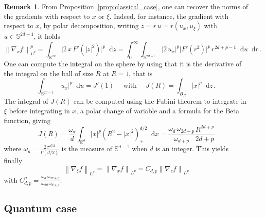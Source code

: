 \documentclass[11pt]{amsart}
\theoremstyle{plain}
\theoremstyle{definition}
\newtheorem{remark}[theorem]{Remark}
\newcommand		{\RR}		{\mathbb R}			%
\newcommand		{\R}		{\RR}
\newcommand		{\Rd}		{\R^d}
\newcommand		{\Rdd}		{\R^{2d}}
\renewcommand	{\SS}		{\mathds S}			%
\newcommand		{\lt}			{\left}				%
\newcommand		{\rt}			{\right}			%
\renewcommand	{\(}			{\lt(}
\renewcommand	{\)}			{\rt)}
\newcommand		{\n}[1]			{\lt\lvert #1 \rt\rvert}
\newcommand		{\nrm}[1]		{\lt\lVert #1\rt\rVert}
\newcommand		{\Nrm}[2]		{\nrm{#1}_{#2}}
\renewcommand		{\d}		{\mathop{}\!\mathrm{d}}		%
\newcommand			{\Dx}		{\nabla_x}
\newcommand			{\Dv}		{\nabla_\xi}
\newcommand		{\intd}			{\int_{\Rd}}
\newcommand		{\intdd}		{\int_{\Rdd}}
\begin{document}
	\begin{remark}
		From Proposition~\ref{prop:classical_case}, one can recover the norms of the gradients with respect to $x$ or $\xi$. Indeed, for instance, the gradient with respect to $x$, by polar decomposition, writing $z=r\,u=r\lt(u_x,u_\xi\rt)$ with $u\in\SS^{2d-1}$, it holds
		\begin{equation*}
			\Nrm{\Dx f}{L^p}^p = \intdd \lvert 2\,x\, F'(\n{z}^2)\rvert^p \d z = \int_0^\infty \int_{\SS^{2d-1}} \n{2\,u_x}^p \lvert F'(r^2)\rvert^{p}\, r^{2d+p-1} \d u \d r \, .
		\end{equation*}
		One can compute the integral on the sphere by using that it is the derivative of the integral on the ball of size $R$ at $R=1$, that is
		\begin{equation*}
			\int_{\SS^{2d-1}} \n{u_x}^p \d u = J'(1) \quad \text{ with } \quad  J(R) = \int_{B_R} \n{x}^p \d z \, .
		\end{equation*}
		The integral of $J(R)$ can be computed using the Fubini theorem to integrate in $\xi$ before integrating in $x$, a polar change of variable and a formula for the Beta function, giving
		\begin{equation*}
			J(R) = \frac{\omega_d}{d} \intd \n{x}^p \lt(R^2-\n{x}^2\rt)_+^{d/2} \d x =  \frac{\omega_d\,\omega_{2d+p}}{\omega_{d+p}} \frac{R^{2d+p}}{2d+p}
		\end{equation*}
		where $\omega_d = \frac{2\,\pi^{d/2}}{\Gamma(d/2)}$ is the measure of $\SS^{d-1}$ when $d$ is an integer. This yields finally
		\begin{equation}\label{eq:partial_gradients}
			\Nrm{\Dv f}{L^p} = \Nrm{\Dx f}{L^p} = C_{d,p} \Nrm{\nabla_z f}{L^p}
		\end{equation}
		with $C_{d,p}^p = \frac{\omega_d\,\omega_{2d+p}}{\omega_{2d}\,\omega_{d+p}}$.
	\end{remark}

\subsection{Quantum case}\label{sec:noMagnet-quantum}
\end{document}
